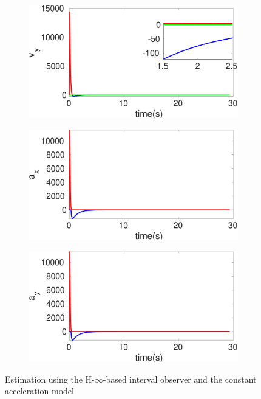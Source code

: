 \begin{figure}[!h]
\begin{subfigure}{.5\linewidth}
\end{subfigure}
\begin{subfigure}{.5\linewidth}
\centering
\includegraphics[width=\linewidth]{figures/HInf/s3caHInfv_y}
\end{subfigure}
\begin{subfigure}{.5\linewidth}
\centering
\includegraphics[width=\linewidth]{figures/HInf/s3caHInfa_x}
\end{subfigure}
\begin{subfigure}{.5\linewidth}
\centering
\includegraphics[width=\linewidth]{figures/HInf/s3caHInfa_y}
\end{subfigure}
\caption{Estimation using the H-$\infty$-based interval observer and the constant acceleration model}
\end{figure}

